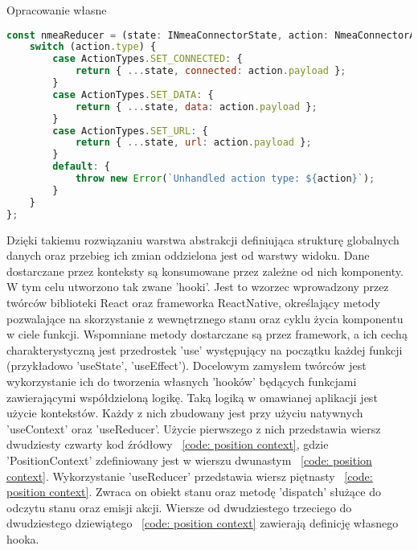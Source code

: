 \documentclass[skorowidz,skroty]{dyplomWEZUT}
\begin{document}
{Opracowanie własne}{\label{code: NMEA reducer}}
\begin{lstlisting}[language=JavaScript]
const nmeaReducer = (state: INmeaConnectorState, action: NmeaConnectorActions): INmeaConnectorState => {
    switch (action.type) {
        case ActionTypes.SET_CONNECTED: {
            return { ...state, connected: action.payload };
        }
        case ActionTypes.SET_DATA: {
            return { ...state, data: action.payload };
        }
        case ActionTypes.SET_URL: {
            return { ...state, url: action.payload };
        }
        default: {
            throw new Error(`Unhandled action type: ${action}`);
        }
    }
};
\end{lstlisting}

Dzięki takiemu rozwiązaniu warstwa abstrakcji definiująca strukturę globalnych danych oraz przebieg ich zmian oddzielona jest od warstwy widoku. Dane dostarczane przez konteksty są konsumowane przez zależne od nich komponenty. W tym celu utworzono tak zwane 'hooki'. Jest to wzorzec wprowadzony przez twórców biblioteki React oraz frameworka ReactNative, określający metody pozwalające na skorzystanie z wewnętrznego stanu oraz cyklu życia komponentu w ciele funkcji. Wspomniane metody dostarczane są przez framework, a ich cechą charakterystyczną jest przedrostek 'use' występujący na początku każdej funkcji (przykładowo 'useState', 'useEffect').  Docelowym zamysłem twórców jest wykorzystanie ich do tworzenia własnych 'hooków' będących funkcjami zawierającymi współdzieloną logikę. Taką logiką w omawianej aplikacji jest użycie kontekstów. Każdy z nich zbudowany jest przy użyciu natywnych  'useContext' oraz 'useReducer'. Użycie pierwszego z nich przedstawia wiersz dwudziesty czwarty  kod źródłowy ~\ref{code: position context}, gdzie 'PositionContext' zdefiniowany jest w wierszu dwunastym ~\ref{code: position context}. Wykorzystanie 'useReducer' przedstawia wiersz piętnasty ~\ref{code: position context}. Zwraca on obiekt stanu oraz metodę 'dispatch' służące do odczytu stanu oraz emisji akcji. Wiersze od dwudziestego trzeciego do dwudziestego dziewiątego ~\ref{code: position context} zawierają definicję własnego hooka.
   
\end{document}
